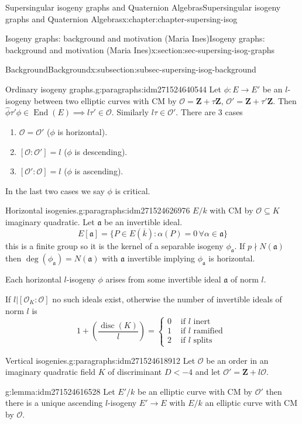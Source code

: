 \documentclass[oneside,10pt,]{book}
\numberwithin{equation}{section}
\newcommand{\ideal}[1]{\mathfrak{#1}}
\newcommand{\lb}{[}
\newcommand{\rb}{]}
\newcommand{\ZZ}{\mathbf{Z}}
\newcommand{\ints}{\mathcal{O}}
\DeclareMathOperator{\End}{End}
\DeclareMathOperator{\disc}{disc}
\newcommand{\lt}{<}
\newcommand{\amp}{&}
\begin{document}
\begin{chapterptx}{Supersingular isogeny graphs and Quaternion Algebras}{}{Supersingular isogeny graphs and Quaternion Algebras}{}{}{x:chapter:chapter-supersing-isog}
\begin{sectionptx}{Isogeny graphs: background and motivation (Maria Ines)}{}{Isogeny graphs: background and motivation (Maria Ines)}{}{}{x:section:sec-supersing-isog-graphs}
\begin{subsectionptx}{Background}{}{Background}{}{}{x:subsection:subsec-supersing-isog-background}
\begin{paragraphs}{Ordinary isogeny graphs.}{g:paragraphs:idm271524640544}
Let \(\phi\colon E\to E'\) be an \(l\)-isogeny between two elliptic curves with CM by \(\ints = \ZZ+\tau\ZZ\), \(\ints ' = \ZZ+\tau'\ZZ\). Then \(\hat\phi \tau' \phi \in \End(E) \implies l\tau ' \in \ints\). Similarly \(l\tau \in \ints'\). There are 3 cases%
\begin{enumerate}
\item{}\(\ints = \ints'\) (\(\phi\) is horizontal).%
\item{}\(\lb\ints : \ints' \rb = l\) (\(\phi\) is descending).%
\item{}\(\lb\ints' : \ints \rb = l\) (\(\phi\) is ascending).%
\end{enumerate}
In the last two cases we say \(\phi\) is critical.%
\end{paragraphs}%
\begin{paragraphs}{Horizontal isogenies.}{g:paragraphs:idm271524626976}%
\(E/k\) with CM by \(\ints \subseteq K\) imaginary quadratic. Let \(\ideal a\) be an invertible ideal.%
\begin{equation*}
E\lb \ideal a \rb = \{ P \in E(\overline k) : \alpha (P)  = 0\, \forall \alpha \in \ideal a\}
\end{equation*}
this is a finite group so it is the kernel of a separable isogeny \(\phi_{\ideal a }\). If \(p \nmid N(\ideal a)\) then \(\deg(\phi_{\ideal a}) = N(\ideal a)\) with \(\ideal a\) invertible implying \(\phi_{\ideal a} \) is horizontal.%
\par
Each horizontal \(l\)-isogeny \(\phi\) arises from some invertible ideal \(\ideal a\) of norm \(l\).%
\par
If \(l | \lb \ints_K : \ints \rb \) no such ideals exist, otherwise the number of invertible ideals of norm \(l\) is%
\begin{equation*}
1+ \left(\frac {\disc(K)}{l}\right) = \begin{cases}0\amp\text{ if }l \text{ inert }\\ 1\amp\text{ if }l \text{ ramified }\\ 2\amp\text{ if }l \text{ splits}\end{cases}
\end{equation*}
%
\end{paragraphs}%
\begin{paragraphs}{Vertical isogenies.}{g:paragraphs:idm271524618912}%
Let \(\ints\) be an order in an imaginary quadratic field \(K \) of discriminant \(D \lt -4\) and let \(\ints' = \ZZ+l\ints\).%
\begin{lemma}{}{}{g:lemma:idm271524616528}%
Let \(E' / k\)  be an elliptic curve with CM by \(\ints '\) then there is a  unique ascending \(l\)-isogeny \(E'\to E\) with \(E/k\) an elliptic curve with CM by \(\ints\).%

\end{lemma}
\end{paragraphs}
\end{subsectionptx}
\end{sectionptx}
\end{chapterptx}
\end{document}
